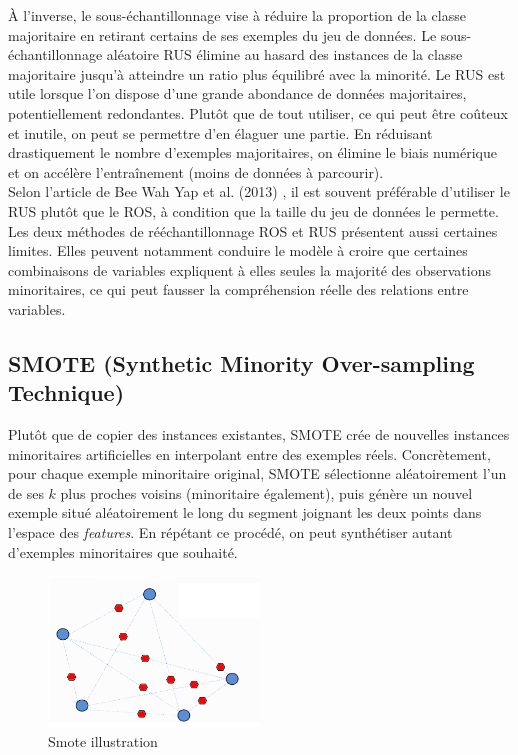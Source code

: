 \documentclass{article}
\begin{document}
À l’inverse, le sous-échantillonnage vise à réduire la proportion de la classe
majoritaire en retirant certains de ses exemples du jeu de données. Le sous-échantillonnage aléatoire
RUS élimine au hasard des instances de la classe majoritaire jusqu’à atteindre
un ratio plus équilibré avec la minorité. Le RUS est utile lorsque l’on dispose d’une grande abondance de
données majoritaires, potentiellement redondantes. Plutôt que de tout utiliser, ce qui peut être
coûteux et inutile, on peut se permettre d’en élaguer une partie. En réduisant drastiquement le nombre
d’exemples majoritaires, on élimine le biais numérique et on accélère l’entraînement (moins de
données à parcourir).
\\

Selon l'article de Bee Wah Yap et al. (2013) \cite{MerwanC}, il est souvent préférable d’utiliser le RUS plutôt que le ROS, à condition que la taille du jeu de données le permette.
\\

Les deux méthodes de rééchantillonnage ROS et RUS présentent aussi certaines limites. Elles peuvent notamment conduire le modèle à croire que certaines combinaisons de variables expliquent à
elles seules la majorité des observations minoritaires, ce qui peut fausser la compréhension
réelle des relations entre variables.

\subsection{SMOTE (Synthetic Minority Over-sampling Technique)}

Plutôt que de copier des instances existantes,
SMOTE crée de nouvelles instances minoritaires artificielles en interpolant entre des exemples réels. Concrètement, pour chaque exemple minoritaire original, SMOTE sélectionne aléatoirement l’un de ses
$k$ plus proches voisins (minoritaire également), puis génère un nouvel exemple situé aléatoirement le
long du segment joignant les deux points dans l’espace des \textit{features}. En répétant ce procédé, on
peut synthétiser autant d’exemples minoritaires que souhaité.

\begin{figure}[h!]
   \centering
   \includegraphics[width=0.50\textwidth]{images/smote.png}
   \caption{Smote illustration}
   \label{fig:example}
\end{figure}
\end{document}
